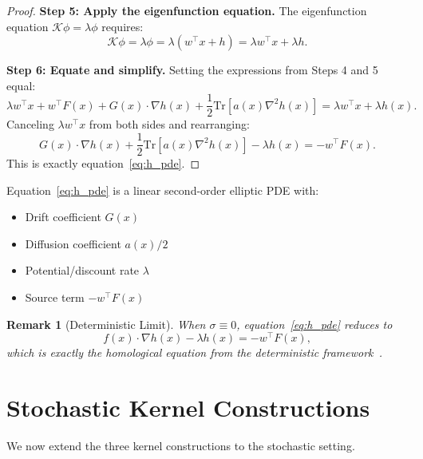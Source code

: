 \documentclass[11pt,a4paper]{article}
\newtheorem{remark}[theorem]{Remark}
\newcommand{\Tr}{\mathrm{Tr}}
\newcommand{\Koop}{\mathcal{K}}
\begin{document}
\begin{proof}
\textbf{Step 5: Apply the eigenfunction equation.}
The eigenfunction equation $\Koop \phi = \lambda \phi$ requires:
\begin{equation}
\Koop \phi = \lambda \phi = \lambda(w^\top x + h) = \lambda w^\top x + \lambda h.
\end{equation}

\textbf{Step 6: Equate and simplify.}
Setting the expressions from Steps 4 and 5 equal:
\begin{equation}
\lambda w^\top x + w^\top F(x) + G(x) \cdot \nabla h(x) + \frac{1}{2}\Tr[a(x) \nabla^2 h(x)] = \lambda w^\top x + \lambda h(x).
\end{equation}
Canceling $\lambda w^\top x$ from both sides and rearranging:
\begin{equation}
G(x) \cdot \nabla h(x) + \frac{1}{2}\Tr[a(x) \nabla^2 h(x)] - \lambda h(x) = -w^\top F(x).
\end{equation}
This is exactly equation~\eqref{eq:h_pde}.
\end{proof}

Equation~\eqref{eq:h_pde} is a linear second-order elliptic PDE with:
\begin{itemize}
\item Drift coefficient $G(x)$
\item Diffusion coefficient $a(x)/2$
\item Potential/discount rate $\lambda$
\item Source term $-w^\top F(x)$
\end{itemize}

\begin{remark}[Deterministic Limit]
When $\sigma \equiv 0$, equation~\eqref{eq:h_pde} reduces to
\begin{equation}
f(x) \cdot \nabla h(x) - \lambda h(x) = -w^\top F(x),
\end{equation}
which is exactly the homological equation from the deterministic framework~\cite{HamziOwhadiVaidya2024}.
\end{remark}

\section{Stochastic Kernel Constructions}\label{sec:stochastic_kernels}

We now extend the three kernel constructions to the stochastic setting.
\end{document}

